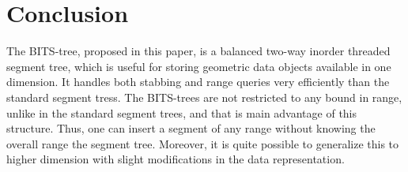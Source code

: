 \documentclass{article}
\begin{document}
\section{Conclusion}
The BITS-tree, proposed in this paper, is a balanced two-way inorder threaded segment tree, which is useful for storing geometric data objects available in one dimension. It handles both stabbing and range queries very efficiently than the standard segment tress. The BITS-trees are not restricted to any bound in range, unlike in the standard segment trees, and that is main advantage of this structure. Thus, one can insert a segment of any range without knowing the overall range the segment tree. Moreover, it is quite possible to generalize this to higher dimension with slight modifications in the data representation.


\end{document}
